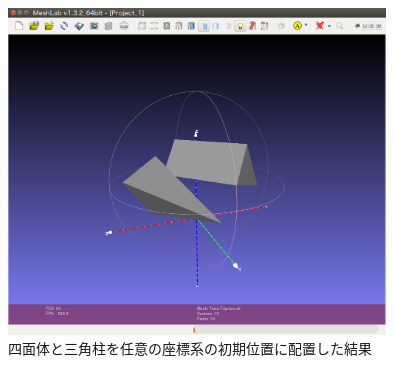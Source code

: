 \documentclass[a4paper,10pt]{jsarticle}
\begin{document}
\begin{figure}[t]
  \centering
  \includegraphics[width=100mm, bb = 0 0 1110 960]{fig/png/Tetra-Triprism.png}
  \caption{四面体と三角柱を任意の座標系の初期位置に配置した結果}
  \label{fig:四面体と三角柱を任意の座標系の初期位置に配置した結果}
\end{figure}
\end{document}
